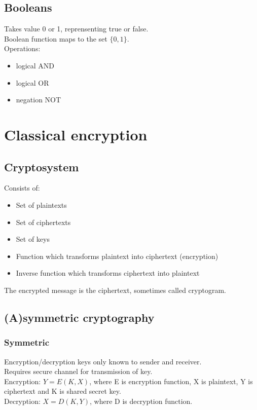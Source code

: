 \documentclass{article}
\begin{document}
\subsection{Booleans}

Takes value 0 or 1, reprensenting true or false.\\
Boolean function maps to the set $\{0,1\}$.\\
Operations:
\begin{itemize}
    \item logical AND
    \item logical OR
    \item negation NOT
\end{itemize}

\newpage \section{Classical encryption}

\subsection{Cryptosystem}

Consists of:
\begin{itemize}
    \item Set of plaintexts
    \item Set of ciphertexts
    \item Set of keys
    \item Function which transforms plaintext into ciphertext (encryption)
    \item Inverse function which transforms ciphertext into plaintext
\end{itemize}
The encrypted message is the ciphertext, sometimes called cryptogram.

\subsection{(A)symmetric cryptography}

\subsubsection{Symmetric}

Encryption/decryption keys only known to sender and receiver.\\
Requires secure channel for transmission of key.\\
Encryption: $Y=E(K,X)$, where E is encryption function, X is plaintext, Y is ciphertext and K is shared secret key.\\
Decryption: $X=D(K,Y)$, where D is decryption function.
\end{document}
